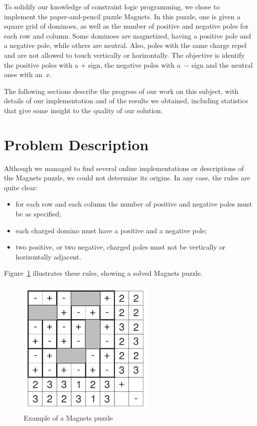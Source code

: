 \documentclass{llncs}
\begin{document}
To solidify our knowledge of constraint logic programming, we chose to implement the paper-and-pencil puzzle Magnets. In this puzzle, one is given a square grid of dominoes, as well as the number of positive and negative poles for each row and column. Some dominoes are magnetized, having a positive pole and a negative pole, while others are neutral. Also, poles with the same charge repel and are not allowed to touch vertically or horizontally. The objective is identify the positive poles with a $+$ sign, the negative poles with a~$-$ sign and the neutral ones with an~$x$.

The following sections describe the progress of our work on this subject, with details of our implementation and of the results we obtained, including statistics that give some insight to the quality of our solution.



\section{Problem Description} 

Although we managed to find several online implementations or descriptions of the Magnets puzzle, we could not determine its origins. In any case, the rules are quite clear:
\begin{itemize}
	\item for each row and each column the number of positive and negative poles must be as specified;
	\item each charged domino must have a positive and a negative pole;
	\item two positive, or two negative, charged poles must not be vertically or horizontally adjacent.
\end{itemize}
Figure~\ref{example} illustrates these rules, showing a solved Magnets puzzle.

\begin{figure}[htbp]
\begin{center}
\includegraphics[scale=0.6]{magnets.jpg}
\caption{Example of a Magnets puzzle}
\label{example}
\end{center}
\end{figure}
\end{document}
